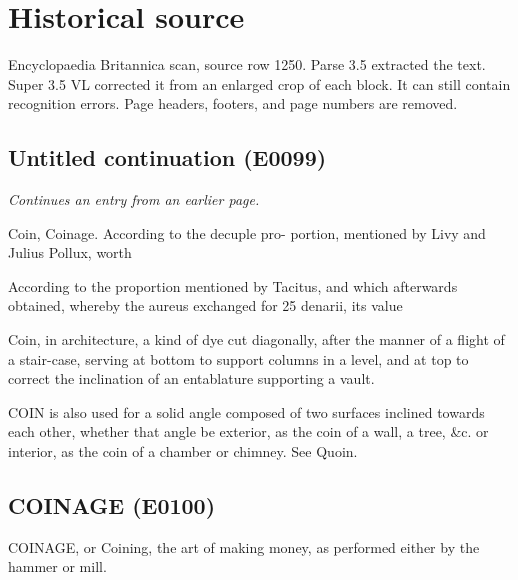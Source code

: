 \documentclass{article}
\begin{document}
\section*{Historical source}
Encyclopaedia Britannica scan, source row 1250. Parse 3.5 extracted the text. Super 3.5 VL corrected it from an enlarged crop of each block. It can still contain recognition errors.
Page headers, footers, and page numbers are removed.

\subsection*{Untitled continuation (E0099)}
\textit{Continues an entry from an earlier page.}

Coin,
Coinage.
According to the decuple pro-
portion, mentioned by Livy and
Julius Pollux, worth

According to the proportion mentioned by Tacitus, and which afterwards obtained, whereby the aureus exchanged for 25 denarii, its value

Coin, in architecture, a kind of dye cut diagonally, after the manner of a flight of a stair-case, serving at bottom to support columns in a level, and at top to correct the inclination of an entablature supporting a vault.

COIN is also used for a solid angle composed of two surfaces inclined towards each other, whether that angle be exterior, as the coin of a wall, a tree, \&c. or interior, as the coin of a chamber or chimney. See Quoin.

\subsection*{COINAGE (E0100)}
COINAGE, or Coining, the art of making money, as performed either by the hammer or mill.
\end{document}
